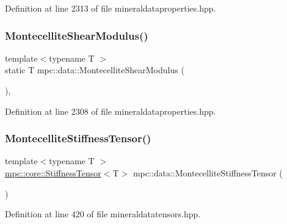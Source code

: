 Definition at line 2313 of file mineraldataproperties.\+hpp.

\mbox{\label{namespacempc_1_1data_a8298960013b1962963c082eb3cc83450}} 
\subsubsection{\texorpdfstring{Montecellite\+Shear\+Modulus()}{MontecelliteShearModulus()}}
{\footnotesize\ttfamily template$<$typename T $>$ \\
static T mpc\+::data\+::\+Montecellite\+Shear\+Modulus (\begin{DoxyParamCaption}{ }\end{DoxyParamCaption})\hspace{0.3cm}{\ttfamily [inline]}, {\ttfamily [static]}}



Definition at line 2308 of file mineraldataproperties.\+hpp.

\mbox{\label{namespacempc_1_1data_ade8b78918c1356a574660bf9d88ea42c}} 
\subsubsection{\texorpdfstring{Montecellite\+Stiffness\+Tensor()}{MontecelliteStiffnessTensor()}}
{\footnotesize\ttfamily template$<$typename T $>$ \\
\mbox{\hyperlink{structmpc_1_1core_1_1_stiffness_tensor}{mpc\+::core\+::\+Stiffness\+Tensor}}$<$T$>$ mpc\+::data\+::\+Montecellite\+Stiffness\+Tensor (\begin{DoxyParamCaption}{ }\end{DoxyParamCaption})}



Definition at line 420 of file mineraldatatensors.\+hpp.

\mbox{\label{namespacempc_1_1data_aae696a475d7a60b1108cf0f27a847307}} 
